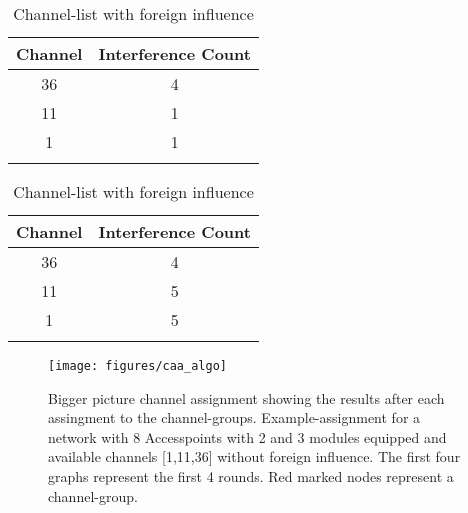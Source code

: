  \begin{table}
    \begin{tabular}{|c|c|}\hline
      Channel & Interference Count\\ \hline
      36 & 4 \\ \hline
      11 & 1 \\ \hline
      1 & 1 \\ \hline
      \caption{Channel-list without foreign influence}
    \end{tabular}
    \begin{tabular}{|c|c|}\hline
      Channel & Interference Count\\ \hline
      36 & 4 \\ \hline
      11 & 5 \\ \hline
      1 & 5 \\ \hline
      \caption{Channel-list with foreign influence}
    \end{tabular}
  \end{table}
 
  \begin{figure}[h]
    \centering
    \texttt{[image: figures/caa\_algo]}
    \caption{Bigger picture channel assignment showing the results after each assingment to the channel-groups. 
    Example-assignment for a network with 8 Accesspoints with 2 and 3 modules equipped and available channels [1,11,36] without foreign influence. 
    The first four graphs represent the first 4 rounds. Red marked nodes represent a channel-group.}
    \label{fig:caa_algo}
  \end{figure}
